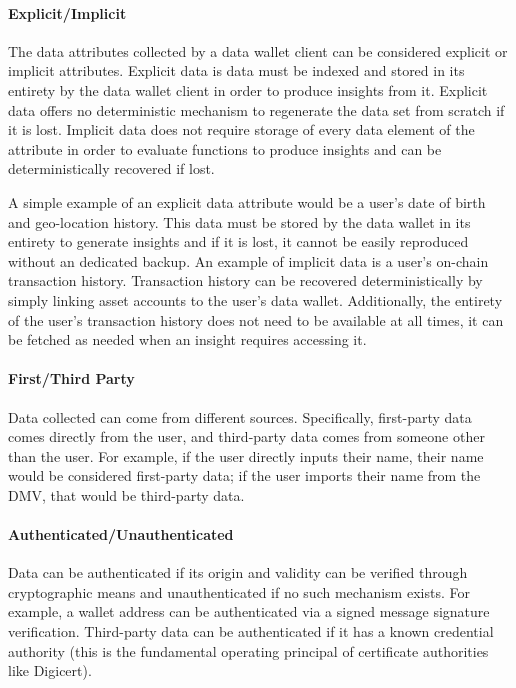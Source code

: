 \paragraph{Explicit/Implicit}
The data attributes collected by a data wallet client can be considered explicit or implicit attributes. Explicit data is data must be indexed and stored in its entirety by the data wallet client in order to produce insights from it. Explicit data offers no deterministic mechanism to regenerate the data set from scratch if it is lost. Implicit data does not require storage of every data element of the attribute in order to evaluate functions to produce insights and can be deterministically recovered if lost. 

A simple example of an explicit data attribute would be a user's date of birth and geo-location history. This data must be stored by the data wallet in its entirety to generate insights and if it is lost, it cannot be easily reproduced without an dedicated backup. An example of implicit data is a user's on-chain transaction history. Transaction history can be recovered deterministically by simply linking asset accounts to the user's data wallet. Additionally, the entirety of the user's transaction history does not need to be available at all times, it can be fetched as needed when an insight requires accessing it. 

\paragraph{First/Third Party}
Data collected can come from different sources. Specifically, first-party data comes directly from the user, and third-party data comes from 
someone other than the user. For example, if the user directly inputs their name, their name would be considered first-party data; if the 
user imports their name from the DMV, that would be third-party data.


\paragraph{Authenticated/Unauthenticated}
Data can be authenticated if its origin and validity can be verified through cryptographic means and unauthenticated if no such mechanism exists. For example, 
a wallet address can be authenticated via a signed message signature verification. Third-party data can be authenticated if it has a known 
credential authority (this is the fundamental operating principal of certificate authorities like Digicert). 

